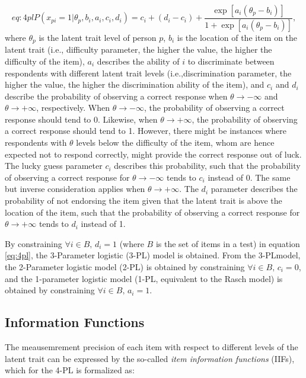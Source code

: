\documentclass{svproc}
\begin{document}
\begin{equation}{eq:4pl}
	P(x_{pi}= 1| \theta_p, b_i, a_i, c_i, d_i) = c_i + (d_i -c_i) + \dfrac{\exp[a_i(\theta_p - b_i)]}{1 + \exp[a_i(\theta_p - b_i)]},
\end{equation}
where $\theta_p$ is the latent trait level of person $p$, $b_i$ is the location of the item on the latent trait (i.e., difficulty parameter, the higher the value, the higher the difficulty of the item), $a_i$ describes the ability of $i$ to discriminate between respondents with different latent trait levels (i.e.,discrimination parameter, the higher the value, the higher the discrimination ability of the item), and $c_i$ and $d_i$ describe the probability of observing a correct response when $\theta \to - \infty$ and $\theta \to +\infty$, respectively. 
When $\theta \to - \infty$, the probability of observing a correct response should tend to 0. Likewise, when $\theta \rightarrow +\infty$, the probability of observing a correct response should tend to 1. 
However, there might be instances where respondents with $\theta$ levels below the difficulty of the item, whom are hence expected not to respond correctly, might provide the correct response out of luck. The lucky guess parameter $c_i$ describes this probability, such that the probability of observing a correct response for $\theta \to - \infty$ tends to $c_i$ instead of 0. 
The same but inverse consideration applies when $\theta \to + \infty$. The $d_i$ parameter describes the probability of not endorsing the item given that the latent trait is above the location of the item, such that the probability of observing a correct response for $\theta \to + \infty$ tends to $d_i$ instead of 1. 

By constraining $\forall i \in B, \, d_i = 1$ (where $B$ is the set of items in a test) in equation \ref{eq:4pl}, the 3-Parameter logistic (3-PL) model is obtained. From the 3-PLmodel, the 2-Parameter logistic model (2-PL) is obtained by constraining $\forall i \in B, \, c_i = 0$, and the 1-parameter logistic model (1-PL, equivalent to the Rasch model) is obtained by constraining $\forall i \in B, \, a_i = 1$. 

\subsection{Information Functions}

The meausemrement precision of each item with respect to different levels of the latent trait can be expressed by the so-called \emph{item information functions} (IIFs), which for the 4-PL is formalized as: 
\end{document}
